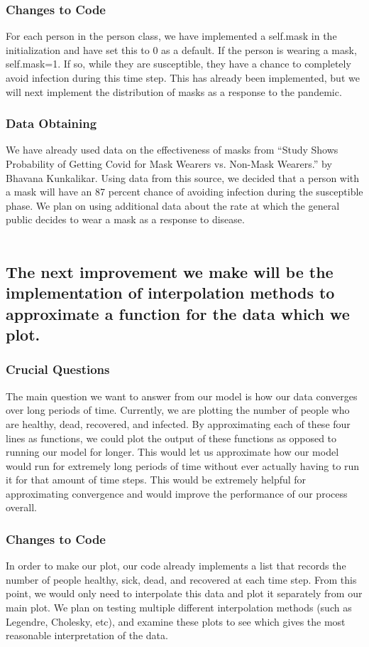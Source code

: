 \documentclass{article}
\begin{document}
\subsubsection{Changes to Code} For each person in the person class, we have implemented a self.mask in the initialization and have set this to 0 as a default. If the person is wearing a mask, self.mask=1. If so, while they are susceptible, they have a chance to completely avoid infection during this time step. This has already been implemented, but we will next implement the distribution of masks as a response to the pandemic. \\
\subsubsection{Data Obtaining} We have already used data on the effectiveness of masks from “Study Shows Probability of Getting Covid for Mask Wearers vs. Non-Mask Wearers.” by Bhavana Kunkalikar. Using data from this source, we decided that a person with a mask will have an 87 percent chance of avoiding infection during the susceptible phase. We plan on using additional data about the rate at which the general public decides to wear a mask as a response to disease. \\\\

\subsection{The next improvement we make will be the implementation of interpolation methods to approximate a function for the data which we plot.}
\subsubsection{Crucial Questions} The main question we want to answer from our model is how our data converges over long periods of time. Currently, we are plotting the number of people who are healthy, dead, recovered, and infected. By approximating each of these four lines as functions, we could plot the output of these functions as opposed to running our model for longer. This would let us approximate how our model would run for extremely long periods of time without ever actually having to run it for that amount of time steps. This would be extremely helpful for approximating convergence and would improve the performance of our process overall. \\
\subsubsection{Changes to Code} In order to make our plot, our code already implements a list that records the number of people healthy, sick, dead, and recovered at each time step. From this point, we would only need to interpolate this data and plot it separately from our main plot. We plan on testing multiple different interpolation methods (such as Legendre, Cholesky, etc), and examine these plots to see which gives the most reasonable interpretation of the data. \\
\end{document}
